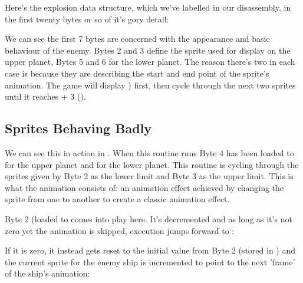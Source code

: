 Here's the explosion data structure, which we've labelled  in
our disassembly, in the first twenty bytes or so of it's gory detail:

%


We can see the first 7 bytes are concerned with the appearance and basic behaviour of the
enemy. Bytes 2 and 3 define the sprite used for display on the upper planet, Bytes 5 and 6
for the lower planet. The reason there's two in each case is because they are describing the
start and end point of the sprite's animation. The game will display  ) first,
then cycle through the next two sprites until it reaches  + 3 (). 

\subsection{Sprites Behaving Badly}

We can see this in action in . When this routine runs Byte 4 has been loaded
to  for the upper planet and 
for the lower planet. This routine is cycling through the sprites given by Byte 2 as the lower limit and Byte 3 as 
the upper limit. This is what the animation consists of: an animation effect achieved by changing the sprite from
one to another to create a classic animation effect.

%

 
Byte 2 (loaded to  comes into play here. It's decremented and as long as it's
not zero yet the animation is skipped, execution jumps forward to :

%


If it is zero, it instead gets reset to the initial value from Byte 2 (stored in
 )
and the current sprite for the enemy ship is incremented to point to the next 'frame' of the ship's animation:


